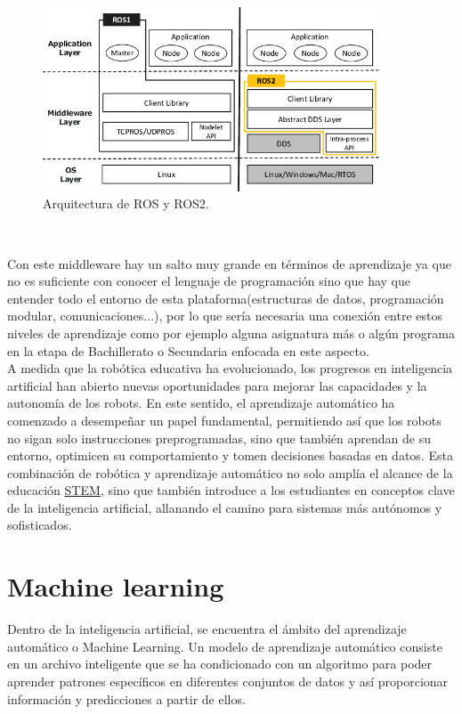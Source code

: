 \begin{figure} [h!]
  \begin{center}
    \includegraphics[width=10cm]{figs/ros.png}
  \end{center}
  \caption{Arquitectura de ROS y ROS2.}
  \label{fig:ros}
\end{figure}\

Con este middleware hay un salto muy grande en términos de aprendizaje ya que no es suficiente con conocer el lenguaje de programación sino que hay que entender todo el entorno de esta plataforma(estructuras de datos, programación modular, comunicaciones...), por lo que sería necesaria una conexión entre estos niveles de aprendizaje como por ejemplo alguna asignatura más o algún programa en la etapa de Bachillerato o Secundaria enfocada en este aspecto.\\

A medida que la robótica educativa ha evolucionado, los progresos en inteligencia artificial han abierto nuevas oportunidades para mejorar las capacidades y la autonomía de los robots. En este sentido, el aprendizaje automático ha comenzado a desempeñar un papel fundamental, permitiendo así que los robots no sigan solo instrucciones preprogramadas, sino que también aprendan de su entorno, optimicen su comportamiento y tomen decisiones basadas en datos. Esta combinación de robótica y aprendizaje automático no solo amplía el alcance de la educación \hyperlink{STEM}{STEM}, sino que también introduce a los estudiantes en conceptos clave de la inteligencia artificial, allanando el camino para sistemas más autónomos y sofisticados.


\section{Machine learning}


Dentro de la inteligencia artificial, se encuentra el ámbito del aprendizaje automático o Machine Learning. Un modelo de aprendizaje automático consiste en un archivo inteligente que se ha condicionado con un algoritmo para poder aprender patrones específicos en diferentes conjuntos de datos y así proporcionar información y predicciones a partir de ellos.\\

